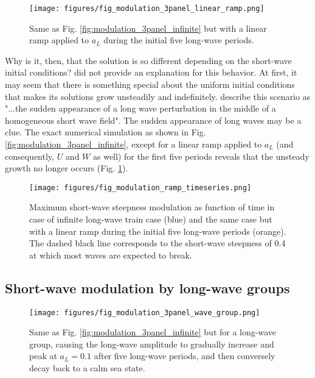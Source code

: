 \documentclass[lineno]{jfm}
\begin{document}
\begin{figure}
\centering
\texttt{[image: figures/fig\_modulation\_3panel\_linear\_ramp.png]}
\caption{
  Same as Fig. \ref{fig:modulation_3panel_infinite} but with a linear ramp
  applied to $a_L$ during the initial five long-wave periods.
}
\label{fig:modulation_3panel_ramp}
\end{figure}

Why is it, then, that the solution is so different depending on the short-wave
initial conditions?
\citet{peureux2021unsteady} did not provide an explanation for this behavior.
At first, it may seem that there is something special about the uniform initial
conditions that makes its solutions grow unsteadily and indefinitely.
\citet{peureux2021unsteady} describe this scenario as "...the sudden appearance
of a long wave perturbation in the middle of a homogeneous short wave field".
The sudden appearance of long waves may be a clue.
The exact numerical simulation as shown in Fig. \ref{fig:modulation_3panel_infinite},
except for a linear ramp applied to $a_L$ (and consequently, $U$ and $W$ as well)
for the first five periods reveals that the unsteady growth no longer occurs
(Fig. \ref{fig:modulation_3panel_ramp}).

\begin{figure}
  \centering
  \texttt{[image: figures/fig\_modulation\_ramp\_timeseries.png]}
  \caption{
    Maximum short-wave steepness modulation as function of time in case of
    infinite long-wave train case (blue) and the same case but with a linear
    ramp during the initial five long-wave periods (orange). The dashed black
    line corresponds to the short-wave steepness of 0.4 at which most waves are
    expected to break.
  }
  \label{fig:unsteady_growth_timeseries}
\end{figure}

\subsection{Short-wave modulation by long-wave groups}
\label{subsection:wave_groups}

\begin{figure}
\centering
\texttt{[image: figures/fig\_modulation\_3panel\_wave\_group.png]}
\caption{
  Same as Fig. \ref{fig:modulation_3panel_infinite} but for a long-wave group,
  causing the long-wave amplitude to gradually increase and peak at $a_L = 0.1$
  after five long-wave periods, and then conversely decay back to a calm sea state.
}
\label{fig:modulation_3panel_groups}
\end{figure}
\end{document}
